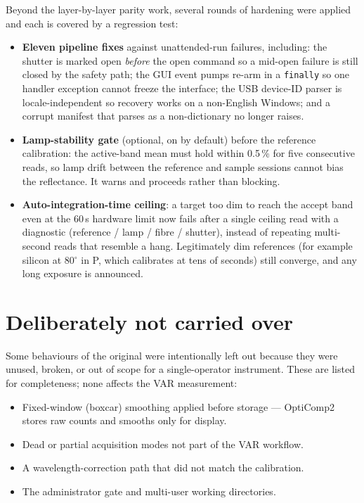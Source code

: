 \documentclass[11pt]{article}
\newcommand{\code}[1]{\texttt{\small #1}}
\begin{document}
Beyond the layer-by-layer parity work, several rounds of hardening were applied and each is covered by
a regression test:

\begin{itemize}
\item \textbf{Eleven pipeline fixes} against unattended-run failures, including: the shutter is marked
open \emph{before} the open command so a mid-open failure is still closed by the safety path; the GUI
event pumps re-arm in a \code{finally} so one handler exception cannot freeze the interface; the USB
device-ID parser is locale-independent so recovery works on a non-English Windows; and a corrupt
manifest that parses as a non-dictionary no longer raises.
\item \textbf{Lamp-stability gate} (optional, on by default) before the reference calibration: the
active-band mean must hold within 0.5\,\% for five consecutive reads, so lamp drift between the
reference and sample sessions cannot bias the reflectance. It warns and proceeds rather than blocking.
\item \textbf{Auto-integration-time ceiling}: a target too dim to reach the accept band even at the
60\,s hardware limit now fails after a single ceiling read with a diagnostic (reference / lamp /
fibre / shutter), instead of repeating multi-second reads that resemble a hang. Legitimately dim
references (for example silicon at 80$^\circ$ in P, which calibrates at tens of seconds) still
converge, and any long exposure is announced.
\end{itemize}

\section{Deliberately not carried over}

Some behaviours of the original were intentionally left out because they were unused, broken, or out
of scope for a single-operator instrument. These are listed for completeness; none affects the VAR
measurement:

\begin{itemize}
\item Fixed-window (boxcar) smoothing applied before storage --- OptiComp2 stores raw counts and
smooths only for display.
\item Dead or partial acquisition modes not part of the VAR workflow.
\item A wavelength-correction path that did not match the calibration.
\item The administrator gate and multi-user working directories.
\end{itemize}
\end{document}
